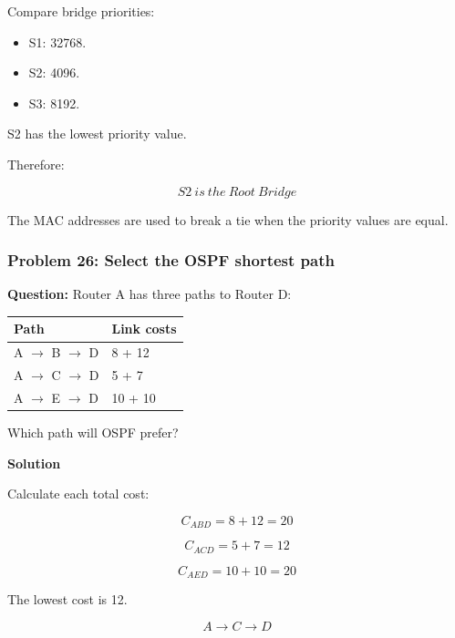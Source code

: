 Compare bridge priorities:

\begin{itemize}
\item S1: 32768.
\item S2: 4096.
\item S3: 8192.
\end{itemize}

S2 has the lowest priority value.

Therefore:



\[
\boxed{S2\ is\ the\ Root\ Bridge}
\]



The MAC addresses are used to break a tie when the priority values are equal.

\subsubsection*{Problem 26: Select the OSPF shortest path}

\textbf{Question:} Router A has three paths to Router D:

\begin{center}
\begin{tabularx}{\linewidth}{p{5.5cm} X}
\toprule
\textbf{Path} & \textbf{Link costs} \\
\midrule
A $\to$ B $\to$ D & 8 + 12 \\
A $\to$ C $\to$ D & 5 + 7 \\
A $\to$ E $\to$ D & 10 + 10 \\
\bottomrule
\end{tabularx}
\end{center}

Which path will OSPF prefer?

\textbf{Solution}

Calculate each total cost:



\[
C_{ABD}=8+12=20
\]





\[
C_{ACD}=5+7=12
\]





\[
C_{AED}=10+10=20
\]



The lowest cost is 12.



\[
\boxed{A\rightarrow C\rightarrow D}
\]



